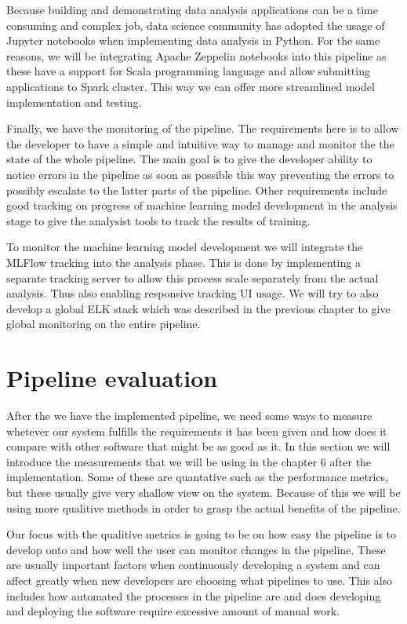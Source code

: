 Because building and demonstrating data analysis applications can be a time consuming and complex job, data science community has adopted the usage of Jupyter notebooks when implementing data analysis in Python.
For the same reasons, we will be integrating Apache Zeppelin notebooks into this pipeline as these have a support for Scala programming language and allow submitting applications to Spark cluster.
This way we can offer more streamlined model implementation and testing.

Finally, we have the monitoring of the pipeline.
The requirements here is to allow the developer to have a simple and intuitive way to manage and monitor the the state of the whole pipeline.
The main goal is to give the developer ability to notice errors in the pipeline as soon as possible this way preventing the errors to possibly escalate to the latter parts of the pipeline.
Other requirements include good tracking on progress of machine learning model development in the analysis stage to give the analysist tools to track the results of training.

To monitor the machine learning model development we will integrate the MLFlow tracking into the analysis phase.
This is done by implementing a separate tracking server to allow this process scale separately from the actual analysis.
Thus also enabling responsive tracking UI usage.
We will try to also develop a global ELK stack which was described in the previous chapter to give global monitoring on the entire pipeline.

\section{Pipeline evaluation}

After the we have the implemented pipeline, we need some ways to measure whetever our system fulfills the requirements it has been given and how does it compare with other software that might be as good as it.
In this section we will introduce the measurements that we will be using in the chapter 6 after the implementation.
Some of these are quantative such as the performance metrics, but these usually give very shallow view on the system.
Because of this we will be using more qualitive methods in order to grasp the actual benefits of the pipeline.

Our focus with the qualitive metrics is going to be on how easy the pipeline is to develop onto and how well the user can monitor changes in the pipeline.
These are usually important factors when continuously developing a system and can affect greatly when new developers are choosing what pipelines to use.
This also includes how automated the processes in the pipeline are and does developing and deploying the software require excessive amount of manual work.

